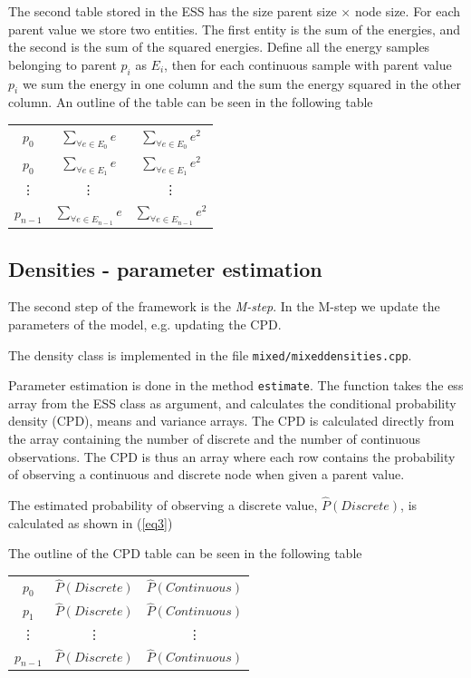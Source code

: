 \documentclass[10pt, journal, compsocconf,a4paper]{IEEEtran}
\begin{document}
The second table stored in the ESS has the size parent size $\times$ node size. For each parent value we store two entities. The first entity is the sum of the energies, and the second is the sum of the squared energies. Define all the energy samples belonging to parent $p_i$ as $E_i$, then for each continuous sample with parent value $p_i$ we sum the energy in one column and the sum the energy squared in the other column. An outline of the table can be seen in the following table
\begin{center}
  \begin{tabular}{c | c | c}
  $p_0$ & $\sum_{\forall e \in E_0} e$ & $\sum_{\forall e \in E_0} e^2$ \\
  $p_0$ & $\sum_{\forall e \in E_1} e$ & $\sum_{\forall e \in E_1} e^2$ \\
  \vdots & \vdots & \vdots \\
  $p_{n-1}$ & $\sum_{\forall e \in E_{n-1}} e$ & $\sum_{\forall e \in E_{n-1}} e^2$ \\
  \end{tabular}  
\end{center}

\subsection{Densities - parameter estimation} %
\label{sub:densities}
The second step of the framework is the \emph{M-step}. In the M-step we update the parameters of the model, e.g. updating the CPD.

The density class is implemented in the file \texttt{mixed/mixeddensities.cpp}. 

Parameter estimation is done in the method \texttt{estimate}. The function takes the ess array from the ESS class as argument, and calculates the conditional probability density (CPD), means and variance arrays. The CPD is calculated directly from the array containing the number of discrete and the number of continuous observations. The CPD is thus an array where each row contains the probability of observing a continuous and discrete node when given a parent value. 

The estimated probability of observing a discrete value, $\hat{P}(Discrete)$, is calculated as shown in (\ref{eq3}) 

The outline of the CPD table can be seen in the following table 

\begin{center}
  \begin{tabular}{c | c | c}
  $p_0$ & $\hat{P}(Discrete)$ & $\hat{P}(Continuous)$\\
  $p_1$ & $\hat{P}(Discrete)$ & $\hat{P}(Continuous)$\\
  \vdots & \vdots & \vdots \\
  $p_{n-1}$ & $\hat{P}(Discrete)$ & $\hat{P}(Continuous)$ 
  \end{tabular}  
\end{center}
\end{document}
